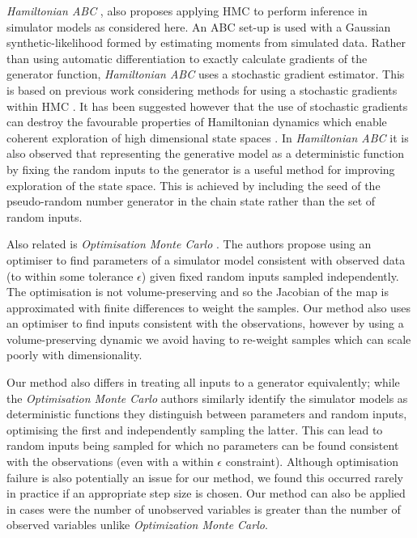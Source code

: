 \emph{Hamiltonian ABC} \cite{meeds2015hamiltonian}, also proposes applying \ac{HMC} to perform inference in simulator models as considered here. An {ABC} set-up is used with a Gaussian synthetic-likelihood formed by estimating moments from simulated data. Rather than using automatic differentiation to exactly calculate gradients of the generator function, \emph{Hamiltonian ABC} uses a stochastic gradient estimator. This is based on previous work considering methods for using a stochastic gradients within \ac{HMC} \citep{welling2011bayesian,chen2014stochastic}. It has been suggested however that the use of stochastic gradients can destroy the favourable properties of Hamiltonian dynamics which enable coherent exploration of high dimensional state spaces \citep{betancourt2015fundamental}. In \emph{Hamiltonian ABC} it is also observed that representing the generative model as a deterministic function by fixing the random inputs to the generator is a useful method for improving exploration of the state space. This is achieved by including the seed of the pseudo-random number generator in the chain state rather than the set of random inputs.

Also related is \emph{Optimisation Monte Carlo} \citep{meeds2015optimization}. The authors propose using an optimiser to find parameters of a simulator model consistent with observed data (to within some tolerance $\epsilon$) given fixed random inputs sampled independently. The optimisation is not volume-preserving and so the Jacobian of the map is approximated with finite differences to weight the samples. Our method also uses an optimiser to find inputs consistent with the observations, however by using a volume-preserving dynamic we avoid having to re-weight samples which can scale poorly with dimensionality. 

Our method also differs in treating all inputs to a generator equivalently; while the \emph{Optimisation Monte Carlo} authors similarly identify the simulator models as deterministic functions they distinguish between parameters and random inputs, optimising the first and independently sampling the latter. This can lead to random inputs being sampled for which no parameters can be found consistent with the observations (even with a within $\epsilon$ constraint). Although optimisation failure is also potentially an issue for our method, we found this occurred rarely in practice if an appropriate step size is chosen. Our method can also be applied in cases were the number of unobserved variables is greater than the number of observed variables unlike \emph{Optimization Monte Carlo}.

